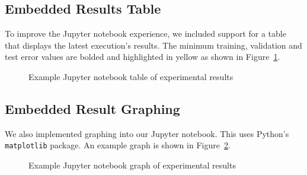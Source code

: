 \documentclass{report}
\begin{document}
  \subsection{Embedded Results Table}
  
  To improve the Jupyter notebook experience, we included support for a table that displays the latest execution's results.  The minimum training, validation and test error values are bolded and highlighted in yellow as shown in Figure~\ref{fig:jupyterTable}.
    
  \begin{figure}[tb]
    \centering
    \caption{Example Jupyter notebook table of experimental results}\label{fig:jupyterTable}
  \end{figure}
  
  \subsection{Embedded Result Graphing}
  
  We also implemented graphing into our Jupyter notebook.  This uses Python's \texttt{matplotlib} package.  An example graph is shown in Figure~\ref{fig:jupyterGraph}.
  
  \begin{figure}[tb]
    \centering
    \caption{Example Jupyter notebook graph of experimental results}\label{fig:jupyterGraph}
  \end{figure}
\end{document}
